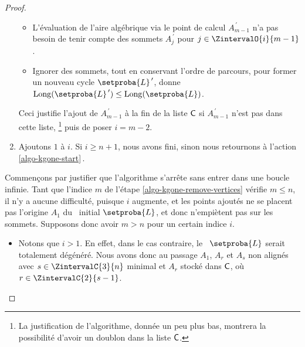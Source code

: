 \begin{proof}
\begin{enumerate}[label=\fbox{\small\bfseries\textsf{A\kern.25pt\arabic*}}]
\begin{itemize}
            \item L'évaluation de l'aire algébrique via le point de calcul $A^{\,\prime}_{m-1}$ n'a pas besoin de tenir compte des sommets $A^{\,\prime}_j$ pour $j \in \ZintervalO{i}{m-1}$.

            \item Ignorer des sommets, tout en conservant l'ordre de parcours, pour former un nouveau cycle $\setproba{L}^{\,\prime}$, donne $\cyclelen{\setproba{L}^{\,\prime}} \leq \cyclelen{\setproba{L}} $.
        \end{itemize}
        
        \noindent
        Ceci justifie l'ajout de
        $A^{\,\prime}_{m-1}$ à la fin de la liste $\mathsf{C}$ si $A^{\,\prime}_{m-1}$ n'est pas dans cette liste,%
        \footnote{
        	La justification de l'algorithme, donnée un peu plus bas, montrera la possibilité d'avoir un doublon dans la liste $\mathsf{C}$.
        }
        puis de poser $i = m - 2$.

	
		\item \label{algo-kgone-loop-back}
		Ajoutons $1$ à $i$.
		Si $i \geq n+1$, nous avons fini, sinon nous retournons à l'action \ref{algo-kgone-start}\,.
    \end{enumerate}
    
    \medskip
    
    Commençons par justifier que l'algorithme s'arrête sans entrer dans une boucle infinie.
    Tant que l'indice $m$ de l'étape \ref{algo-kgone-remove-vertices} vérifie $m \leq n$, il n'y a aucune difficulté, puisque $i$ augmente, et les points ajoutés ne se placent pas  l'origine $A_1$ du \ncycle\ initial $\setproba{L}$, et donc n'empiètent pas sur les  sommets. Supposons donc avoir $m > n$ pour un certain indice $i$.
    \begin{itemize}
        \item Notons que $i > 1$. 
        En effet,
        dans le cas contraire, le \ncycle\ $\setproba{L}$ serait totalement dégénéré. Nous avons donc au passage $A_1$, $A_r$ et $A_s$ non alignés avec $s \in \ZintervalC{3}{n}$ minimal et $A_r$ stocké dans $\mathsf{C}$, où $r \in \ZintervalC{2}{s-1}$. 



\end{itemize}
\end{proof}
